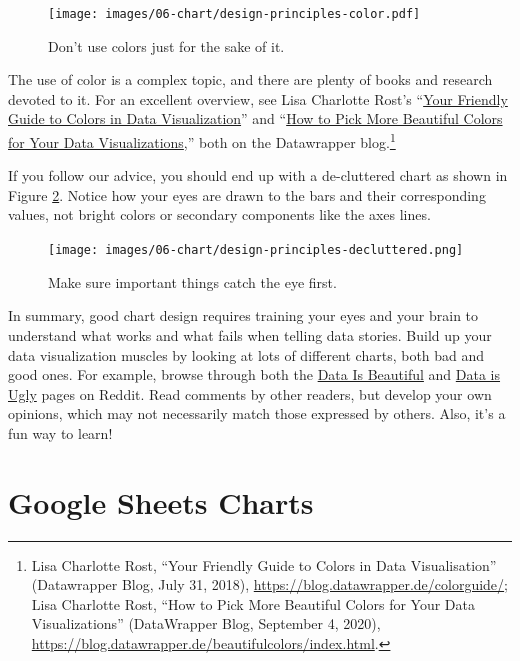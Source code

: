 \documentclass[
  english,
]{book}
\begin{document}
\begin{figure}
\centering
\texttt{[image: images/06-chart/design-principles-color.pdf]}
\caption{\label{fig:design-principles-color}Don't use colors just for the sake of it.}
\end{figure}

The use of color is a complex topic, and there are plenty of books and research devoted to it. For an excellent overview, see Lisa Charlotte Rost's ``\href{https://blog.datawrapper.de/colorguide/}{Your Friendly Guide to Colors in Data Visualization}'' and ``\href{https://blog.datawrapper.de/beautifulcolors/index.html}{How to Pick More Beautiful Colors for Your Data Visualizations},'' both on the Datawrapper blog.\footnote{Lisa Charlotte Rost, {``Your {Friendly Guide} to {Colors} in {Data Visualisation}''} ({Datawrapper Blog}, July 31, 2018), \url{https://blog.datawrapper.de/colorguide/}; Lisa Charlotte Rost, {``How to {Pick More Beautiful Colors} for {Your Data Visualizations}''} ({DataWrapper Blog}, September 4, 2020), \url{https://blog.datawrapper.de/beautifulcolors/index.html}.}

If you follow our advice, you should end up with a de-cluttered chart as shown in
Figure \ref{fig:design-principles-decluttered}. Notice how your eyes are drawn to the bars and their corresponding values, not bright colors or secondary components like the axes lines.



\begin{figure}
\centering
\texttt{[image: images/06-chart/design-principles-decluttered.png]}
\caption{\label{fig:design-principles-decluttered}Make sure important things catch the eye first.}
\end{figure}

In summary, good chart design requires training your eyes and your brain to understand what works and what fails when telling data stories. Build up your data visualization muscles by looking at lots of different charts, both bad and good ones. For example, browse through both the \href{https://www.reddit.com/r/dataisbeautiful/}{Data Is Beautiful} and \href{https://www.reddit.com/r/dataisugly/}{Data is Ugly} pages on Reddit. Read comments by other readers, but develop your own opinions, which may not necessarily match those expressed by others. Also, it's a fun way to learn!

\hypertarget{chart-google}{%
\section*{Google Sheets Charts}\label{chart-google}}
\end{document}
